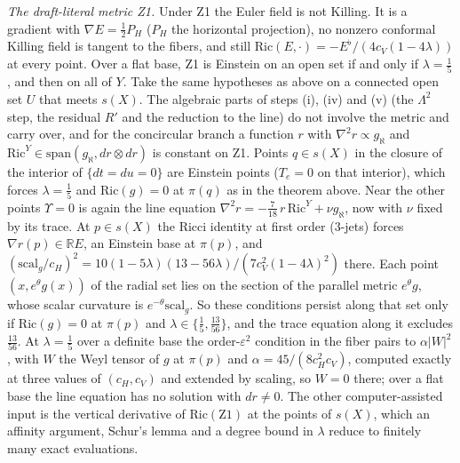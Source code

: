 \documentclass[11pt]{article}
\theoremstyle{remark}
\begin{document}
\emph{The draft-literal metric Z1.} Under Z1 the Euler field is not Killing. It is a gradient with $\nabla E=\tfrac12P_H$ ($P_H$ the horizontal projection), no nonzero conformal Killing field is tangent to the fibers, and still $\mathrm{Ric}(E,\cdot)=-E^\flat/(4c_V(1-4\lambda))$ at every point. Over a flat base, Z1 is Einstein on an open set if and only if $\lambda=\tfrac15$, and then on all of $Y$. Take the same hypotheses as above on a connected open set $U$ that meets $s(X)$. The algebraic parts of steps (i), (iv) and (v) (the $\Lambda^2$ step, the residual $R'$ and the reduction to the line) do not involve the metric and carry over, and for the concircular branch a function $r$ with $\nabla^2r\propto g_\aleph$ and $\mathrm{Ric}^Y\in\mathrm{span}(g_\aleph,dr\otimes dr)$ is constant on Z1. Points $q\in s(X)$ in the closure of the interior of $\{dt=du=0\}$ are Einstein points ($T_e=0$ on that interior), which forces $\lambda=\tfrac15$ and $\mathrm{Ric}(g)=0$ at $\pi(q)$ as in the theorem above. Near the other points $\Upsilon=0$ is again the line equation $\nabla^2r=-\tfrac7{18}\,r\,\mathrm{Ric}^Y+\nu g_\aleph$, now with $\nu$ fixed by its trace. At $p\in s(X)$ the Ricci identity at first order (3-jets) forces $\nabla r(p)\in\mathbb RE$, an Einstein base at $\pi(p)$, and $(\mathrm{scal}_g/c_H)^2=10(1-5\lambda)(13-56\lambda)/(7c_V^2(1-4\lambda)^2)$ there. Each point $(x,e^\theta g(x))$ of the radial set lies on the section of the parallel metric $e^\theta g$, whose scalar curvature is $e^{-\theta}\mathrm{scal}_g$. So these conditions persist along that set only if $\mathrm{Ric}(g)=0$ at $\pi(p)$ and $\lambda\in\{\tfrac15,\tfrac{13}{56}\}$, and the trace equation along it excludes $\tfrac{13}{56}$. At $\lambda=\tfrac15$ over a definite base the order-$\varepsilon^2$ condition in the fiber pairs to $\alpha|W|^2$, with $W$ the Weyl tensor of $g$ at $\pi(p)$ and $\alpha=45/(8c_H^2c_V)$, computed exactly at three values of $(c_H,c_V)$ and extended by scaling, so $W=0$ there; over a flat base the line equation has no solution with $dr\neq0$. The other computer-assisted input is the vertical derivative of $\mathrm{Ric}(\mathrm{Z1})$ at the points of $s(X)$, which an affinity argument, Schur's lemma and a degree bound in $\lambda$ reduce to finitely many exact evaluations.
\end{document}
